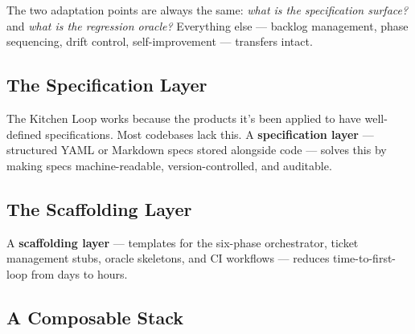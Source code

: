 \documentclass[11pt,a4paper]{article}
\begin{document}
The two adaptation points are always the same: \emph{what is the specification surface?} and \emph{what is the regression oracle?} Everything else --- backlog management, phase sequencing, drift control, self-improvement --- transfers intact.

\subsection{The Specification Layer}\label{sec:specification-layer}

The Kitchen Loop works because the products it's been applied to have well-defined specifications. Most codebases lack this. A \textbf{specification layer} --- structured YAML or Markdown specs stored alongside code --- solves this by making specs machine-readable, version-controlled, and auditable.

\subsection{The Scaffolding Layer}\label{sec:scaffolding-layer}

A \textbf{scaffolding layer} --- templates for the six-phase orchestrator, ticket management stubs, oracle skeletons, and CI workflows --- reduces time-to-first-loop from days to hours.

\subsection{A Composable Stack}\label{sec:a-composable-stack}

\begin{figure}[h]
\centering
{}
\end{figure}
\end{document}
